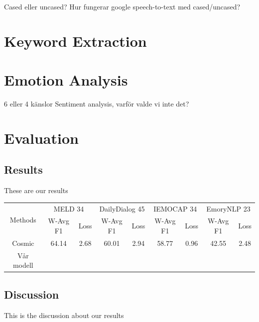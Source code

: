 \documentclass[nofilelist]{cslthse-msc}
\begin{document}
Cased eller uncased? Hur fungerar google speech-to-text med cased/uncased?

\chapter{Keyword Extraction}
\chapter{Emotion Analysis}
6 eller 4 känslor
Sentiment analysis, varför valde vi inte det?


\chapter{Evaluation}

\section{Results}

These are our results

\begin{center}
\begin{tabular}{|c|cc|cc|cc|cc|}
\hline
\multirow{2}{*}{Methods} & \multicolumn{2}{c|}{MELD 34}            & \multicolumn{2}{c|}{DailyDialog 45}     & \multicolumn{2}{c|}{IEMOCAP 34}         & \multicolumn{2}{c|}{EmoryNLP 23}        \\ \cline{2-9} 
                         & \multicolumn{1}{c|}{W-Avg F1} & Loss & \multicolumn{1}{c|}{W-Avg F1} & Loss & \multicolumn{1}{c|}{W-Avg F1} & Loss & \multicolumn{1}{c|}{W-Avg F1} & Loss \\ \hline
Cosmic                   & 64.14                         & 2.68 & 60.01                         & 2.94 & 58.77                         & 0.96 & 42.55                         & 2.48 \\ \hline
Vår modell               &                               &      &                               &      &                               &      &                               &      \\ \hline
\end{tabular}
\end{center}


\section{Discussion}
This is the discussion about our results
\end{document}
